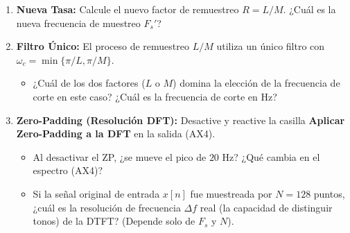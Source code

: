 \documentclass[11pt, a4paper]{article}
\begin{document}
\begin{enumerate}
    \item \textbf{Nueva Tasa:} Calcule el nuevo factor de remuestreo $R = L/M$. ¿Cuál es la nueva frecuencia de muestreo $F_s'$?
    \item \textbf{Filtro Único:} El proceso de remuestreo $L/M$ utiliza un único filtro con $\omega_c = \min\{\pi/L, \pi/M\}$.
    \begin{itemize}
        \item ¿Cuál de los dos factores ($L$ o $M$) domina la elección de la frecuencia de corte en este caso? ¿Cuál es la frecuencia de corte en $\text{Hz}$?
    \end{itemize}
    \item \textbf{Zero-Padding (Resolución DFT):} Desactive y reactive la casilla \textbf{Aplicar Zero-Padding a la DFT} en la salida (AX4).
    \begin{itemize}
        \item Al desactivar el ZP, ¿se mueve el pico de $20 \text{ Hz}$? ¿Qué cambia en el espectro (AX4)?
        \item Si la señal original de entrada $x[n]$ fue muestreada por $N=128$ puntos, ¿cuál es la resolución de frecuencia $\Delta f$ real (la capacidad de distinguir tonos) de la DTFT? (Depende solo de $F_s$ y $N$).
    \end{itemize}
\end{enumerate}
\end{document}
